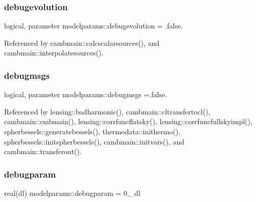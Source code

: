 \mbox{\label{namespacemodelparams_a69b1cd59448404e0bcd21612fb8e69c9}} 
\subsubsection{\texorpdfstring{debugevolution}{debugevolution}}
{\footnotesize\ttfamily logical, parameter modelparams\+::debugevolution = .false.}



Referenced by cambmain\+::calcscalarsources(), and cambmain\+::interpolatesources().

\mbox{\label{namespacemodelparams_a2fccc38c501c6f494fa1ced55e52a983}} 
\subsubsection{\texorpdfstring{debugmsgs}{debugmsgs}}
{\footnotesize\ttfamily logical, parameter modelparams\+::debugmsgs =.false.}



Referenced by lensing\+::badharmonic(), cambmain\+::cltransfertocl(), cambmain\+::cmbmain(), lensing\+::corrfuncflatsky(), lensing\+::corrfuncfullskyimpl(), spherbessels\+::generatebessels(), thermodata\+::inithermo(), spherbessels\+::initspherbessels(), cambmain\+::initvars(), and cambmain\+::transferout().

\mbox{\label{namespacemodelparams_a35a694469321a4414b622d9a0ec18f1f}} 
\subsubsection{\texorpdfstring{debugparam}{debugparam}}
{\footnotesize\ttfamily real(dl) modelparams\+::debugparam = 0.\+\_\+dl}

\mbox{\label{namespacemodelparams_afcc43d2b71977053be4631323ffeafbc}} 
